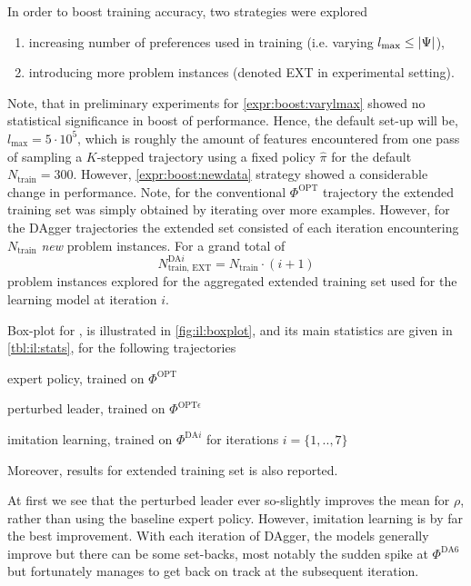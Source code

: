 \documentclass[smallextended]{svjour3}
\begin{document}
In order to boost training accuracy, two strategies were explored 
\begin{enumerate}[after={{}}, leftmargin=*,
  label={\textbf{Boost.\arabic*}}, ref={{Boost.\arabic*}}]
  \item \label{expr:boost:varylmax} increasing number of preferences used 
  in training (i.e. varying \mbox{$l_{\max} \leq \lvert\Psi\rvert$}),
  \item \label{expr:boost:newdata} introducing more problem instances (denoted 
  EXT in experimental setting).
\end{enumerate}
Note, that in preliminary experiments for \ref{expr:boost:varylmax} showed no 
statistical significance in boost of performance. Hence, the default set-up 
will be, $l_{\max}=5 \cdot 10^5$, which is roughly the amount of features 
encountered from one pass of sampling a \mbox{$K$-stepped} trajectory using a 
fixed policy $\hat{\pi}$ for the default $N_{\text{train}}=300$.
However, \ref{expr:boost:newdata} strategy showed a considerable change in 
performance. 
Note, for the conventional $\Phi^{\text{OPT}}$ trajectory the extended training 
set was simply obtained by iterating over more examples. 
However, for the DAgger trajectories the extended set consisted of each 
iteration encountering $N_{\text{train}}$ \emph{new} problem 
instances. For a grand total of 
\begin{equation}
N^{\text{DA}i}_{\text{train, EXT}}=N_{\text{train}}\cdot (i+1) 
\end{equation}
problem instances explored for the aggregated extended training set used for 
the learning model at iteration $i$.

Box-plot for  \namerho, is illustrated in \cref{fig:il:boxplot}, 
and its main statistics are given in \cref{tbl:il:stats}, for the following 
trajectories
\begin{enumerate*}
  \item expert policy, trained on $\Phi^{\text{OPT}}$
  \item perturbed leader, trained on $\Phi^{\text{OPT}\epsilon}$
  \item imitation learning, trained on $\Phi^{\text{DA}i}$ for iterations 
  $i=\{1,..,7\}$
\end{enumerate*}
Moreover, results for extended training set is also reported.

At first we see that the perturbed leader ever so-slightly improves the mean 
for $\rho$, rather than using the baseline expert policy. However, imitation 
learning is by far the best improvement. With each iteration of DAgger, the 
models generally improve but there can be some set-backs, most notably the 
sudden spike at $\Phi^{\text{DA}6}$ but fortunately manages to get back on 
track at the subsequent iteration. 
\end{document}
